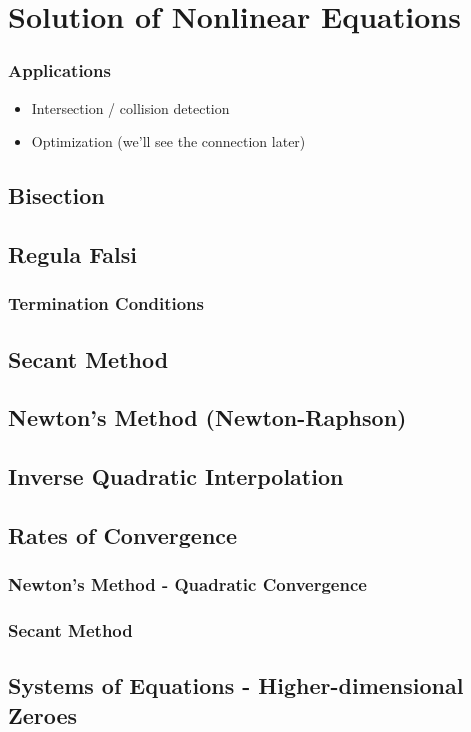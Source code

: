     \chapter{Solution of Nonlinear Equations}
    
    \subsection*{Applications}
    \begin{itemize}
        \item Intersection / collision detection
        \item Optimization (we'll see the connection later)
    \end{itemize}
    
    \section{Bisection}

    
    \section{Regula Falsi}
    
    \subsection{Termination Conditions}
    
    \section{Secant Method}
    
    \section{Newton's Method (Newton-Raphson)}
    
    \section{Inverse Quadratic Interpolation}
    
    \section{Rates of Convergence}
    
    \subsection{Newton's Method - Quadratic Convergence}
    
    \subsection{Secant Method}
    
    \section{Systems of Equations - Higher-dimensional Zeroes}